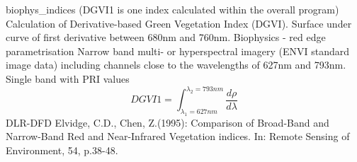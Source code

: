 %
{ %
biophys\_indices (DGVI1 is one index calculated within the overall program)
}
%
{ %
Calculation of Derivative-based Green Vegetation Index (DGVI). Surface under curve of first derivative between 680nm and 760nm.
}
%
{ %
Biophysics - red edge parametrisation
}
%
{ %
Narrow band multi- or hyperspectral imagery (ENVI standard image data) including channels close to the wavelengths of 627nm and 793nm.\bigskip
}
%
{ %
Single band with PRI values
}
%
{ %
\begin{displaymath}
DGVI1 = \int _{\lambda_1 =627nm}^{\lambda_2 =793nm} \frac{d   \rho}{d   \lambda }
\end{displaymath}
}
%
{ %
DLR-DFD
}
%
{ %
Elvidge, C.D., Chen, Z.(1995): Comparison of Broad-Band and Narrow-Band Red and Near-Infrared Vegetation indices. In: Remote Sensing of Environment, 54, p.38-48.
}
